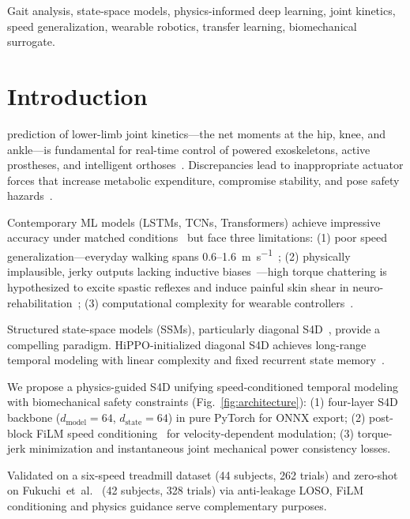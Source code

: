 \documentclass[journal]{IEEEtran}
\newcommand{\dmodel}{d_{\mathrm{model}}}
\newcommand{\dstate}{d_{\mathrm{state}}}
\begin{document}
\begin{IEEEkeywords}
Gait analysis, state-space models, physics-informed deep learning, joint kinetics, speed generalization, wearable robotics, transfer learning, biomechanical surrogate.
\end{IEEEkeywords}

\section{Introduction}
 prediction of lower-limb joint kinetics---the net moments at the hip, knee, and ankle---is fundamental for real-time control of powered exoskeletons, active prostheses, and intelligent orthoses~\cite{lim2019review}. Discrepancies lead to inappropriate actuator forces that increase metabolic expenditure, compromise stability, and pose safety hazards~\cite{tucker2015control}.

Contemporary ML models (LSTMs, TCNs, Transformers) achieve impressive accuracy under matched conditions~\cite{mundt2020prediction, johnson2021comparison, sharifi2023biomat} but face three limitations: (1) poor speed generalization---everyday walking spans 0.6--1.6~\si{\metre\per\second}~\cite{bohannon2011comfortable}; (2) physically implausible, jerky outputs lacking inductive biases~\cite{dorschky2019cnn, stanev2020learning}---high torque chattering is hypothesized to excite spastic reflexes and induce painful skin shear in neuro-rehabilitation~\cite{baud2021review}; (3) computational complexity for wearable controllers~\cite{goel2022s, young2017state}.

Structured state-space models (SSMs), particularly diagonal S4D~\cite{gu2022parameterization}, provide a compelling paradigm. HiPPO-initialized diagonal S4D achieves long-range temporal modeling with linear complexity and fixed recurrent state memory~\cite{goel2022s}.

We propose a physics-guided S4D unifying speed-conditioned temporal modeling with biomechanical safety constraints (Fig.~\ref{fig:architecture}): (1) four-layer S4D backbone ($\dmodel=64$, $\dstate=64$) in pure PyTorch for ONNX export; (2) post-block FiLM speed conditioning~\cite{perez2018film} for velocity-dependent modulation; (3) torque-jerk minimization and instantaneous joint mechanical power consistency losses.

Validated on a six-speed treadmill dataset (44 subjects, 262 trials) and zero-shot on Fukuchi~et~al.~\cite{fukuchi2018public} (42 subjects, 328 trials) via anti-leakage LOSO, FiLM conditioning and physics guidance serve complementary purposes.
\end{document}
